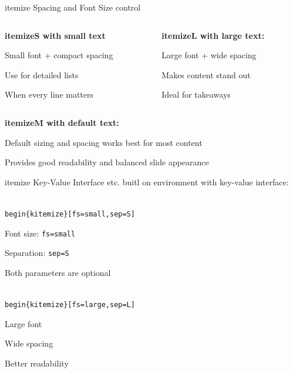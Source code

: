 \documentclass[11pt,compress,t,notes=noshow, xcolor=table]{beamer}
\begin{document}
\begin{frame}{itemize Spacing and Font Size control}
  
  \begin{columns}[T]
    \begin{column}{0.48\textwidth}
      \textbf{itemizeS with small text}
      \begin{itemizeS}[small]
        \item Small font + compact spacing
        \item Use for detailed lists
        \item When every line matters
      \end{itemizeS}
    \end{column}
    
    \begin{column}{0.48\textwidth}
      \textbf{itemizeL with large text:}
      \begin{itemizeL}[large]
        \item Large font + wide spacing
        \item Makes content stand out
        \item Ideal for takeaways
      \end{itemizeL}
    \end{column}
  \end{columns}
  
  \vspace{2ex}
  
  \textbf{itemizeM with default text:}
  \begin{itemizeM}
    \item Default sizing and spacing works best for most content
    \item Provides good readability and balanced slide appearance
  \end{itemizeM}
  
\end{frame}


\begin{frame}{itemize Key-Value Interface}
   etc. buitl on  environment with key-value interface:
  
  \vspace{1ex}
  \texttt{\\begin\{kitemize\}[fs=small,sep=S]}
  \begin{kitemize}[fs=small,sep=S]
    \item Font size: \texttt{fs=small}
    \item Separation: \texttt{sep=S}
    \item Both parameters are optional
  \end{kitemize}
  
  \vspace{1ex}
  \texttt{\\begin\{kitemize\}[fs=large,sep=L]}
  \begin{kitemize}[fs=large,sep=L]
    \item Large font
    \item Wide spacing
    \item Better readability
  \end{kitemize}
\end{frame}
\end{document}
